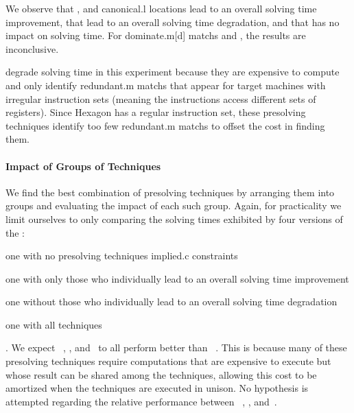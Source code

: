 We observe that , and
\gls{canonical.l} \glspl{location} lead to an overall solving time improvement,
that  lead
to an overall solving time degradation, and that
 has no impact on solving time.
%
For \gls{dominate.m}[d] \glspl{match} and
, the
results are inconclusive.

 degrade
solving time in this experiment because they are expensive to compute and only
identify \gls{redundant.m} \glspl{match} that appear for \glspl{target machine}
with irregular \glspl{instruction set} (meaning the \glspl{instruction} access
different sets of \glspl{register}).
%
Since \gls{Hexagon} has a regular \gls{instruction set}, these \gls{presolving}
techniques identify too few \gls{redundant.m} \glspl{match} to offset the cost
in finding them.


\paragraph{Impact of Groups of Techniques}

We find the best combination of \gls{presolving} techniques by arranging them
into groups and evaluating the impact of each such group.
%
Again, for practicality we limit ourselves to only comparing the solving times
exhibited by four versions of the :
%
\begin{modelList}
  \item {}
    one with no \gls{presolving} techniques
\gls{implied.c} \glspl{constraint}
  \item {}
    one with only those who individually lead to an overall solving time
    improvement
  \item {}
    one without those who individually lead to an overall solving time
    degradation
  \item {}
    one with all techniques
\end{modelList}.
%
We expect ~,
, and~ to all perform
better than ~.
%
This is because many of these \gls{presolving} techniques require computations
that are expensive to execute but whose result can be shared among the
techniques, allowing this cost to be amortized when the techniques are executed
in unison.
%
No hypothesis is attempted regarding the relative performance between
~,
, and~.

